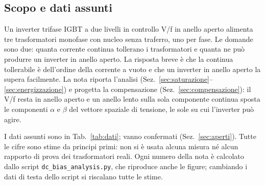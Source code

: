 \documentclass[10pt,a4paper]{scrartcl}
\newcommand{\code}[1]{\texttt{#1}}
\begin{document}

\tableofcontents
\newpage
\begin{onehalfspace}

\section{Scopo e dati assunti}
\label{sec:scopo}

Un inverter trifase IGBT a due livelli in controllo V/f in anello aperto alimenta tre trasformatori monofase con nucleo senza traferro, uno per fase. Le domande sono due: quanta corrente continua tollerano i trasformatori e quanta ne può produrre un inverter in anello aperto. La risposta breve è che la continua tollerabile è dell'ordine della corrente a vuoto e che un inverter in anello aperto la supera facilmente. La nota riporta l'analisi (Sez.~\ref{sec:saturazione}--\ref{sec:energizzazione}) e progetta la compensazione (Sez.~\ref{sec:compensazione}): il V/f resta in anello aperto e un anello lento sulla sola componente continua sposta le componenti $\alpha$ e $\beta$ del vettore spaziale di tensione, le sole su cui l'inverter può agire.

I dati assunti sono in Tab.~\ref{tab:dati}; vanno confermati (Sez.~\ref{sec:aperti}). Tutte le cifre sono stime da principi primi: non si è usata alcuna misura né alcun rapporto di prova dei trasformatori reali. Ogni numero della nota è calcolato dallo script \code{dc\_bias\_analysis.py}, che riproduce anche le figure; cambiando i dati di testa dello script si riscalano tutte le stime.


\end{onehalfspace}
\end{document}
